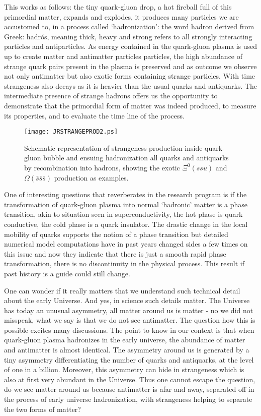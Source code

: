 \documentclass[twocolumn,showdate,prd,aps]{revtex4}
\begin{document}
This works as follows: the tiny quark-gluon drop, a hot fireball full of this primordial matter, expands and  explodes, it produces many particles we are accustomed to, in a process called `hadronization': the word hadron derived from Greek:  
hadr\'os, meaning thick, heavy and strong refers to  all strongly interacting particles and antiparticles. As energy contained in the quark-gluon plasma is used up to create matter and antimatter particles  particles, the high abundance of strange quark pairs present in the plasma is preserved and as outcome we observe not only antimatter but also exotic forms  containing strange particles. With time strangeness also decays as it is heavier than the usual quarks and antiquarks. The intermediate presence of strange hadrons  offers us the opportunity to demonstrate that the primordial form of matter was indeed produced, to measure its properties, and to evaluate the time line  of the process. 

\begin{figure}[tb]
\centerline{\texttt{[image: JRSTRANGEPROD2.ps]}}
\caption{ %
Schematic representation of strangeness production inside quark-gluon bubble and ensuing hadronization all quarks and antiquarks by recombination into hadrons, showing the exotic $\Xi^0\!(ssu)$  and $\Omega(\bar s\bar s \bar s)$ production as examples. 
\label{hadronize}}
\end{figure}

One of interesting questions that reverberates in the research program is if the transformation of quark-gluon plasma into normal `hadronic' matter is a phase transition, akin to situation seen in superconductivity, the hot phase is quark conductive, the cold phase is a quark insulator. The drastic change in the local mobility of quarks supports the notion of a phase transition but detailed numerical model computations have in past years changed sides a few times on this issue and now they indicate that there is just a smooth rapid phase transformation, there is no discontinuity in the physical process. This result if past history is a guide could still change. 

One can wonder if it really matters that  we understand such technical detail about the early Universe. And yes, in science such details matter. The Universe has today an unusual asymmetry, all matter around us is matter - no we did not misspeak, what we say is that we do not see antimatter. The question how this is possible excites many discussions. The point to know in our context is that when quark-gluon plasma hadronizes in the early universe, the abundance of matter and antimatter is almost identical. The asymmetry around us is generated by a tiny asymmetry differentiating the number of quarks and antiquarks, at the level of  one in a billion. Moreover, this asymmetry can hide in strangeness which is also at first very abundant in the Universe. Thus one cannot escape the question, do we see matter around us because antimatter is afar and away, separated off in the process of  early universe hadronization, with strangeness helping to separate the two forms of matter? 
\end{document}

